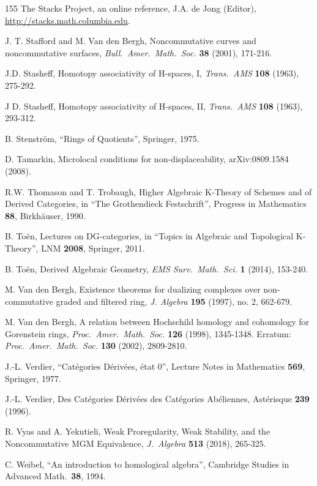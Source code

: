 \begin{thebibliography}{155}
 The Stacks Project, an online reference, J.A. de Jong (Editor),\\  
\url{http://stacks.math.columbia.edu}.

 J. T. Stafford and M. Van den Bergh,
Noncommutative curves and noncommutative surfaces,
{\em Bull.\ Amer.\ Math.\ Soc.} {\bf 38} (2001), 171-216.

 J.D. Stasheff, 
Homotopy associativity of H-spaces, I,
{\em Trans.\ AMS} {\bf 108} (1963), 275-292.

 J D. Stasheff, 
Homotopy associativity of H-spaces, II, 
{\em Trans.\ AMS} {\bf 108} (1963), 293-312.

 B. Stenstr\"om, ``Rings of Quotients'', Springer, 1975.

 D. Tamarkin,
Microlocal conditions for non-displaceability,
arXiv:0809.1584 (2008). 

 R.W. Thomason and T. Trobaugh,
Higher Algebraic K-Theory of Schemes and of Derived Categories,
in ``The Grothendieck Festschrift'', 
Progress in Mathematics {\bf 88}, Birkh\"auser, 1990.

 B. To\"en,
Lectures on DG-categories, in
``Topics in Algebraic and Topological K-Theory'', 
LNM {\bf 2008}, Springer, 2011. 

 B. To\"en,
Derived Algebraic Geometry, 
{\em EMS Surv.\ Math.\ Sci.} {\bf 1} (2014), 153-240.

 M. Van den Bergh, 
Existence theorems for dualizing complexes over non-commutative
graded and filtered ring, {\em J. Algebra} {\bf 195} (1997), no. 2, 662-679.

 M. Van den Bergh, 
A relation between Hochschild homology and cohomology for Gorenstein rings,
{\em Proc.\ Amer.\ Math.\ Soc.} {\bf 126} (1998), 1345-1348.
Erratum: {\em Proc.\ Amer.\ Math.\ Soc.} {\bf 130} (2002), 2809-2810.

 J.-L. Verdier, 
``Cat\'egories D\'eriv\'ees, \'etat 0'', 
Lecture Notes in Mathematics {\bf 569}, Springer, 1977. 

 J.-L. Verdier, 
Des Cat\'egories D\'eriv\'ees des Cat\'egories Ab\'eliennes, 
Ast\'erisque {\bf 239} (1996).  

 R. Vyas and A. Yekutieli,
Weak Proregularity, Weak Stability, and the Noncommutative MGM Equivalence,
{\em J.\ Algebra} {\bf 513} (2018), 265-325.

 C. Weibel, 
``An introduction to homological algebra'',
Cambridge Studies in Advanced Math.\ {\bf 38}, 1994.


\end{thebibliography}
